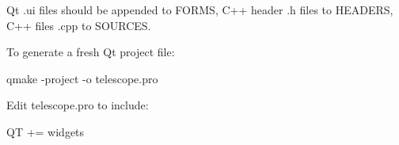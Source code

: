 Qt {\ttfamily .ui} files should be appended to {\ttfamily F\+O\+R\+MS}, C++ header {\ttfamily .h} files to {\ttfamily H\+E\+A\+D\+E\+RS}, C++ files {\ttfamily .cpp} to {\ttfamily S\+O\+U\+R\+C\+ES}.

To generate a fresh Qt project file\+: 
\begin{DoxyCode}
qmake -project -o telescope.pro
\end{DoxyCode}
 Edit {\ttfamily telescope.\+pro} to include\+: 
\begin{DoxyCode}
QT += widgets
\end{DoxyCode}
 